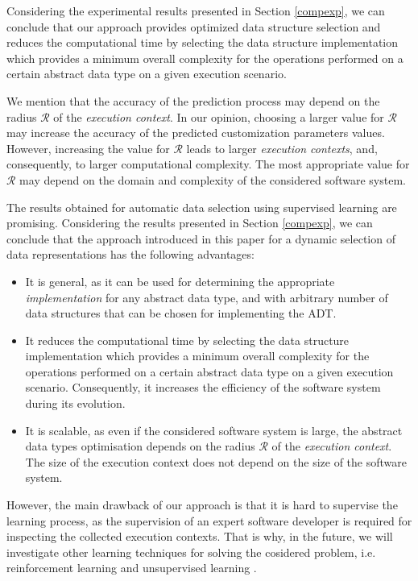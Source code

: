 Considering the experimental results presented in Section \ref{compexp}, we can conclude that our approach provides optimized data structure selection and reduces the computational time by selecting the data structure implementation which provides a minimum overall complexity for the operations performed on a certain abstract data type on a given execution scenario.

We mention that the accuracy of the prediction process may depend on the radius $\mathcal{R}$ of the \emph{execution context}. In our opinion, choosing a larger value for $\mathcal{R}$ may increase the accuracy of the predicted customization parameters values.  
However, increasing the value for $\mathcal{R}$ leads to larger \emph{execution contexts}, and, consequently, to larger computational complexity. The most appropriate value for $\mathcal{R}$ may depend on the domain and complexity of the considered software system.

The results obtained for automatic data selection using supervised learning are promising.  Considering the results presented in Section \ref{compexp}, we can conclude that the approach introduced in this paper for a dynamic selection of data representations has the following advantages:

\begin{itemize}

\item It is general, as it can be used for determining the appropriate \emph{implementation} for any abstract data type, and with arbitrary number of data structures that can be chosen for implementing the ADT.   

\item It reduces the computational time by selecting the data structure implementation which provides a minimum overall complexity for the operations performed on a certain abstract data type on a given execution scenario. Consequently, it increases the efficiency of the software system during its evolution.

\item It is scalable, as even if the considered software system is large, the abstract data types optimisation depends on the radius $\mathcal{R}$ of the \emph{execution context}. The size of the execution context does not depend on the size of the software system.

\end{itemize}

However, the main drawback of our approach is that it is hard to supervise the learning process, as the supervision of an expert software developer is required for inspecting the collected execution contexts. That is why, in the future, we will investigate other learning techniques for solving the cosidered problem, i.e. reinforcement learning \cite{sutton} and unsupervised learning \cite{mitchell}. 

